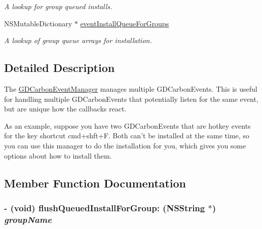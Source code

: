 \begin{DoxyCompactItemize}
\begin{DoxyCompactList}\small\item\em A lookup for group queued installs. \item\end{DoxyCompactList}\item 
\hypertarget{interface_g_d_carbon_event_manager_a46b6eb173c9eaf13f9f64af8bce78d5b}{
NSMutableDictionary $\ast$ \hyperlink{interface_g_d_carbon_event_manager_a46b6eb173c9eaf13f9f64af8bce78d5b}{eventInstallQueueForGroups}}
\label{interface_g_d_carbon_event_manager_a46b6eb173c9eaf13f9f64af8bce78d5b}

\begin{DoxyCompactList}\small\item\em A lookup of group queue arrays for installation. \item\end{DoxyCompactList}\end{DoxyCompactItemize}


\subsection{Detailed Description}
The \hyperlink{interface_g_d_carbon_event_manager}{GDCarbonEventManager} manages multiple GDCarbonEvents. This is useful for handling multiple GDCarbonEvents that potentially listen for the same event, but are unique how the callbacks react.

As an example, suppose you have two GDCarbonEvents that are hotkey events for the key shortcut cmd+shft+F. Both can't be installed at the same time, so you can use this manager to do the installation for you, which gives you some options about how to install them. 

\subsection{Member Function Documentation}
\hypertarget{interface_g_d_carbon_event_manager_a88f2451e02706edb8034b946d6bc25be}{
\subsubsection[{flushQueuedInstallForGroup:}]{\setlength{\rightskip}{0pt plus 5cm}-\/ (void) flushQueuedInstallForGroup: ({\bf NSString} $\ast$) {\em groupName}}}
\label{interface_g_d_carbon_event_manager_a88f2451e02706edb8034b946d6bc25be}


